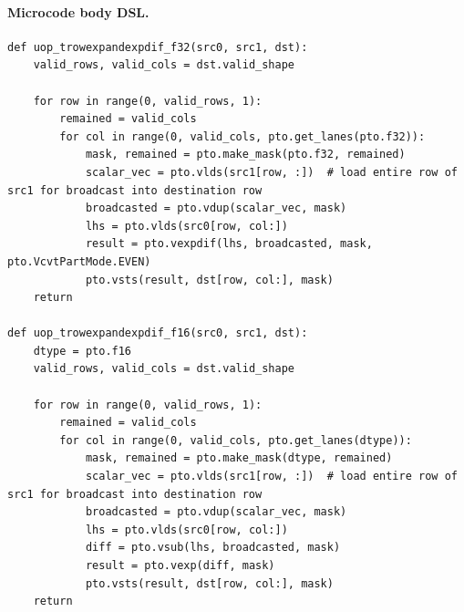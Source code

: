 \paragraph{Microcode body DSL.}
\begin{lstlisting}[style=ptocode]
def uop_trowexpandexpdif_f32(src0, src1, dst):
    valid_rows, valid_cols = dst.valid_shape

    for row in range(0, valid_rows, 1):
        remained = valid_cols
        for col in range(0, valid_cols, pto.get_lanes(pto.f32)):
            mask, remained = pto.make_mask(pto.f32, remained)
            scalar_vec = pto.vlds(src1[row, :])  # load entire row of src1 for broadcast into destination row
            broadcasted = pto.vdup(scalar_vec, mask)
            lhs = pto.vlds(src0[row, col:])
            result = pto.vexpdif(lhs, broadcasted, mask, pto.VcvtPartMode.EVEN)
            pto.vsts(result, dst[row, col:], mask)
    return

def uop_trowexpandexpdif_f16(src0, src1, dst):
    dtype = pto.f16
    valid_rows, valid_cols = dst.valid_shape

    for row in range(0, valid_rows, 1):
        remained = valid_cols
        for col in range(0, valid_cols, pto.get_lanes(dtype)):
            mask, remained = pto.make_mask(dtype, remained)
            scalar_vec = pto.vlds(src1[row, :])  # load entire row of src1 for broadcast into destination row
            broadcasted = pto.vdup(scalar_vec, mask)
            lhs = pto.vlds(src0[row, col:])
            diff = pto.vsub(lhs, broadcasted, mask)
            result = pto.vexp(diff, mask)
            pto.vsts(result, dst[row, col:], mask)
    return
\end{lstlisting}
\Needspace{0.34\textheight}
